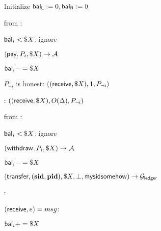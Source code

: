 \begin{bbox}[title={$\Fpay (P_L,P_R,\Delta)$}]

Initialize ${\mathsf {bal_L}} := 0, {\mathsf {bal_R}} := 0$

\OnInput {} from \Partyi:

	\quad \If ${\mathsf {bal}}_i < \$X$: ignore  

	\quad \Leak $({\mathsf {pay}},P_i,\$X) \rightarrow \mathcal{A}$

	\quad ${\mathsf {bal}}_i -= \$X$

	\quad \If $P_{\neg i}$ is honest: \Buffer $(({\mathsf {receive}},\$X),1,P_{\neg i})$

	\quad \Else: \Buffer $(({\mathsf {receive}},\$X),O(\Delta),P_{\neg i})$ 

\OnInput {} from \Partyi:

	\quad \If ${\mathsf {bal}}_i < \$X$: ignore

	\quad \Leak $({\mathsf {withdraw}},P_i,\$X) \rightarrow \mathcal{A}$

	\quad ${\mathsf {bal}}_i -= \$X$

	\quad \Send $({\mathsf {transfer}}, (\mathbf{sid},\mathbf{pid}), \$X, \bot, {\mathsf {mysidsomehow}}) \rightarrow \mathcal{G}_{{\mathsf {ledger}}}$

\OnInput {}:

	\quad \If $({\mathsf {receive}},e) = msg$:

		\qquad ${\mathsf {bal}}_i += \$X$
	

\end{bbox}

